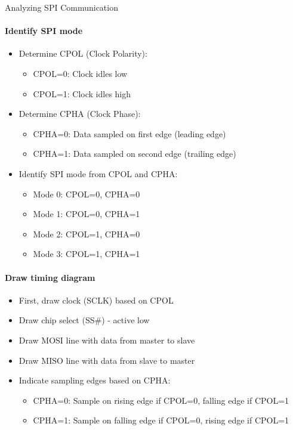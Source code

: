 \begin{KR}{Analyzing SPI Communication}
\paragraph{Identify SPI mode}
\begin{itemize}
    \item Determine CPOL (Clock Polarity):
    \begin{itemize}
        \item CPOL=0: Clock idles low
        \item CPOL=1: Clock idles high
    \end{itemize}
    \item Determine CPHA (Clock Phase):
    \begin{itemize}
        \item CPHA=0: Data sampled on first edge (leading edge)
        \item CPHA=1: Data sampled on second edge (trailing edge)
    \end{itemize}
    \item Identify SPI mode from CPOL and CPHA:
    \begin{itemize}
        \item Mode 0: CPOL=0, CPHA=0
        \item Mode 1: CPOL=0, CPHA=1
        \item Mode 2: CPOL=1, CPHA=0
        \item Mode 3: CPOL=1, CPHA=1
    \end{itemize}
\end{itemize}

\paragraph{Draw timing diagram}
\begin{itemize}
    \item First, draw clock (SCLK) based on CPOL
    \item Draw chip select (SS\#) - active low
    \item Draw MOSI line with data from master to slave
    \item Draw MISO line with data from slave to master
    \item Indicate sampling edges based on CPHA:
    \begin{itemize}
        \item CPHA=0: Sample on rising edge if CPOL=0, falling edge if CPOL=1
        \item CPHA=1: Sample on falling edge if CPOL=0, rising edge if CPOL=1
    \end{itemize}
\end{itemize}


\end{KR}
